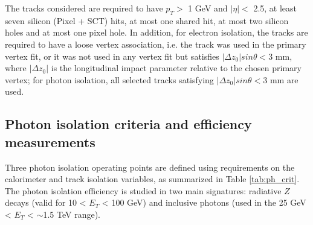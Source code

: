 \documentclass[a4paper, oneside, 11pt, openright]{book}
\begin{document}
\begin{itemize}
				The tracks considered are required to have $p_T >$ 1 GeV and $|\eta| <$ 2.5, at least seven silicon (Pixel + SCT) hits, at most one shared hit, at most two silicon holes and at most one pixel hole. In addition, for electron isolation, the tracks are required to have a loose vertex association, i.e. the track was used in the primary vertex fit, or it was not used in any vertex fit but satisfies $|\Delta z_0|sin{\theta} < 3$ mm, where $|\Delta z_0|$ is the longitudinal impact parameter relative to the chosen primary vertex; for photon
				isolation, all selected tracks satisfying $|\Delta z_0|sin{\theta} < 3$ mm are used.
			\end{itemize}
			
			\subsection{Photon isolation criteria and efficiency measurements}
			Three photon isolation operating points are defined using requirements on the calorimeter and track isolation variables, as summarized in Table \ref{tab:ph_crit}. The photon isolation efficiency is studied in two main signatures: radiative $Z$ decays (valid for 10 < $E_T$ < 100 GeV) and inclusive photons (used in the 25 GeV < $E_T$ < $\sim$1.5 TeV range).
			
			\begin{center}
				\small
				\begin{table}[htbp]
					\caption{Definition of the photon isolation working points.}
					\label{tab:ph_crit} 
				\end{table}
			\end{center}
\end{document}
